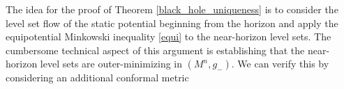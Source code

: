 \documentclass[12pt,twoside]{article}
\theoremstyle{plain}
\theoremstyle{definition}
\theoremstyle{remark}
\numberwithin{equation}{section}
\begin{document}

The idea for the proof of Theorem \ref{black_hole_uniqueness} is to consider the level set flow of the static potential beginning from the horizon and apply the equipotential Minkowski inequality \eqref{equi} to the near-horizon level sets. The cumbersome technical aspect of this argument is establishing that the near-horizon level sets are outer-minimizing in $(M^{n},g_{-})$. We can verify this by considering an additional conformal metric
\end{document}
